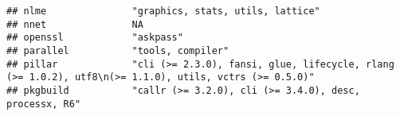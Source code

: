\documentclass[
]{article}
\begin{document}
\begin{verbatim}
## nlme               "graphics, stats, utils, lattice"                                                                                                                                                                                                                                                                                                                                                                                                            
## nnet               NA                                                                                                                                                                                                                                                                                                                                                                                                                                           
## openssl            "askpass"                                                                                                                                                                                                                                                                                                                                                                                                                                    
## parallel           "tools, compiler"                                                                                                                                                                                                                                                                                                                                                                                                                            
## pillar             "cli (>= 2.3.0), fansi, glue, lifecycle, rlang (>= 1.0.2), utf8\n(>= 1.1.0), utils, vctrs (>= 0.5.0)"                                                                                                                                                                                                                                                                                                                                        
## pkgbuild           "callr (>= 3.2.0), cli (>= 3.4.0), desc, processx, R6"                                                                                                                                                                                                                                                                                                                                                                                       

\end{verbatim}
\end{document}
